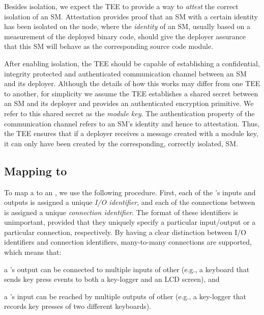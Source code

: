 \label{concept:attestation}
%
Besides isolation, we expect the \ac{TEE} to provide a way to \emph{attest}
the correct isolation of an \ac{SM}.
%
\label{concept:pm-identity}
%
Attestation provides proof that an \ac{SM} with a certain identity has been
isolated on the node, where the \emph{identity} of an \ac{SM}, usually based on a measurement of the deployed binary code, should give
the deployer assurance that this \ac{SM} will behave as the corresponding
source code module.

\label{concept:secure-communication}
%
After enabling isolation, the \ac{TEE} should be capable of establishing a
confidential, integrity protected and authenticated communication channel
between an \ac{SM} and its deployer.  Although the details of how this works may
differ from one \ac{TEE} to another, for simplicity we assume the \ac{TEE}
establishes a shared secret between an \ac{SM} and its deployer and provides an
authenticated encryption primitive.  We refer to this shared secret as the
\emph{module key}.  The authentication property of the communication channel
refers to an \ac{SM}'s identity and hence to attestation.  Thus, the \ac{TEE}
ensures that if a deployer receives a message created with a module key, it can
only have been created by the corresponding, correctly isolated, \ac{SM}.

\subsection{Mapping \reactmods{} to \protmods{}}
\label{concept:compilation}
%
To map a \reactmod{} to an \protmod, we use the following procedure.  First,
each of the \reactmod's inputs and outputs is assigned a unique \emph{I/O
identifier}, and each of the connections between \reactmods{} is assigned a
unique \emph{connection identifier}. The format of these identifiers is
unimportant, provided that they uniquely specify a particular input/output or a
particular connection, respectively. By having a clear distinction between I/O
identifiers and connection identifiers, many-to-many connections are supported,
which means that:
%
\begin{paraenum}
    \item a \reactmod's output can be connected to multiple inputs of
    other \reactmods{} (e.g., a keyboard that sends key press events to both
    a key-logger and an LCD screen), and
    \item a \reactmod's input can be reached by
    multiple outputs of other \reactmods{} (e.g., a key-logger that records
    key presses of two different keyboards).
  \end{paraenum}

